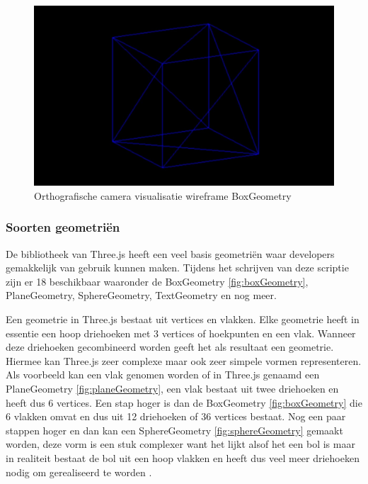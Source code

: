 \begin{figure}
	\centering
	\includegraphics[width=1\linewidth]{graphics/orthografischeCamera}
	\caption[Orthografische camera visualisatie]{Orthografische camera visualisatie wireframe BoxGeometry}
	\label{fig:orthografischeCamera}
\end{figure}
\newpage
\subsubsection{Soorten geometriën}

De bibliotheek van Three.js heeft een veel basis geometriën waar developers gemakkelijk van gebruik kunnen maken. Tijdens het schrijven van deze scriptie zijn er 18 beschikbaar waaronder de BoxGeometry \ref{fig:boxGeometry}, PlaneGeometry, SphereGeometry, TextGeometry en nog meer.

Een geometrie in Three.js bestaat uit vertices en vlakken. Elke geometrie heeft in essentie een hoop driehoeken met 3 vertices of hoekpunten en een vlak. Wanneer deze driehoeken gecombineerd worden geeft het als resultaat een geometrie. Hiermee kan Three.js zeer complexe maar ook zeer simpele vormen representeren. Als voorbeeld kan een vlak genomen worden of in Three.js genaamd een PlaneGeometry \ref{fig:planeGeometry}, een vlak bestaat uit twee driehoeken en heeft dus 6 vertices. Een stap hoger is dan de BoxGeometry \ref{fig:boxGeometry} die 6 vlakken omvat en dus uit 12 driehoeken of 36 vertices bestaat. Nog een paar stappen hoger en dan kan een SphereGeometry \ref{fig:sphereGeometry} gemaakt worden, deze vorm is een stuk complexer want het lijkt alsof het een bol is maar in realiteit bestaat de bol uit een hoop vlakken en heeft dus veel meer driehoeken nodig om gerealiseerd te worden \autocite{threejs2023}.

